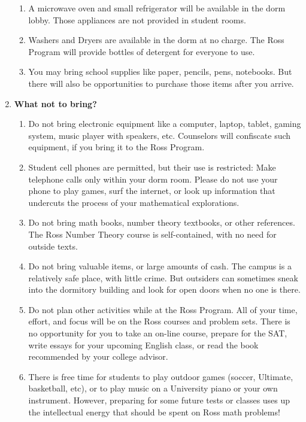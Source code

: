 \documentclass[11pt]{rossasia}
\begin{document}
\begin{enumerate}[label=(\arabic*),itemsep=2em,topsep=-1em]
\begin{enumerate}[label=(\alph*),itemsep=0.5em,topsep=0em]
 \item A microwave oven and small refrigerator will be available in
   the dorm lobby.  Those appliances are not provided in student
   rooms.
 \item Washers and Dryers are available in the dorm at no charge.  The
   Ross Program will provide bottles of detergent for everyone to use.
 \item You may bring school supplies like paper, pencils, pens,
   notebooks.  But there will also be opportunities to purchase those
   items after you arrive.
\end{enumerate}
\item \textbf{What not to bring?}
  \begin{enumerate}[label=(\alph*),itemsep=0.5em,topsep=0em]
  \item Do not bring electronic equipment like a computer, laptop,
    tablet, gaming system, music player with speakers, etc.  
    Counselors will confiscate such equipment, if you bring it to the
    Ross Program.
  \item Student cell phones are permitted, but their use is
    restricted: Make telephone calls only within your dorm room.
    Please do not use your phone to play games, surf the internet, or
    look up information that undercuts the process of your
    mathematical explorations.
  \item Do not bring math books, number theory textbooks, or other references.  
    The Ross Number Theory course is self-contained, with no need for 
    outside texts.
  \item Do not bring valuable items, or large amounts of cash.  The
    campus is a relatively safe place, with little crime.  But
    outsiders can sometimes sneak into the dormitory building and look
    for open doors when no one is there.
  \item Do not plan other activities while at the Ross Program. All of 
    your time, effort, and focus will be on the Ross courses and problem 
    sets.  There is no opportunity for you to take an on-line course, 
    prepare  for the SAT, write essays for your upcoming English 
    class, or read the book recommended by your college advisor.
  \item There is free time for students to play outdoor games (soccer, Ultimate, 
    basketball, etc), or to play music on a University piano or your own 
    instrument.   However, preparing for some future tests or classes uses up 
    the intellectual energy that should be spent on Ross math problems!
\end{enumerate}
\end{enumerate}
\end{document}

